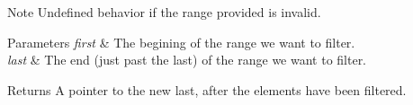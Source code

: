 \begin{DoxyNote}{Note}
Undefined behavior if the range provided is invalid.
\end{DoxyNote}

\begin{DoxyParams}{Parameters}
{\em first} & The begining of the range we want to filter. \\
\hline
{\em last} & The end (just past the last) of the range we want to filter. \\
\hline
\end{DoxyParams}
\begin{DoxyReturn}{Returns}
A pointer to the new last, after the elements have been filtered. 
\end{DoxyReturn}
